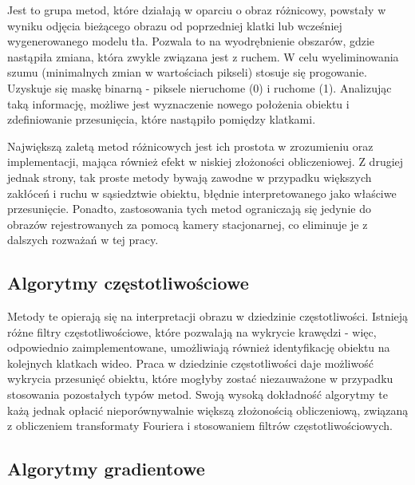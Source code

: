 Jest to grupa metod, które działają w oparciu o obraz różnicowy, powstały w wyniku odjęcia bieżącego obrazu od poprzedniej klatki lub wcześniej wygenerowanego modelu tła. %
Pozwala to na wyodrębnienie obszarów, gdzie nastąpiła zmiana, która zwykle związana jest z ruchem. %
W celu wyeliminowania szumu (minimalnych zmian w wartościach pikseli) stosuje się progowanie. 
Uzyskuje się maskę binarną - piksele nieruchome (0) i ruchome (1). 
Analizując taką informację, możliwe jest wyznaczenie nowego położenia obiektu i zdefiniowanie przesunięcia, które nastąpiło pomiędzy klatkami. 

Największą zaletą metod różnicowych jest ich prostota w zrozumieniu oraz implementacji, mająca również efekt w niskiej złożoności obliczeniowej. 
Z drugiej jednak strony, tak proste metody bywają zawodne w przypadku większych zakłóceń i ruchu w sąsiedztwie obiektu, błędnie interpretowanego jako właściwe przesunięcie. 
Ponadto, zastosowania tych metod ograniczają się jedynie do obrazów rejestrowanych za pomocą kamery stacjonarnej, co eliminuje je z dalszych rozważań w tej pracy. 


\subsection{Algorytmy częstotliwościowe}

Metody te opierają się na interpretacji obrazu w dziedzinie częstotliwości. 
Istnieją różne filtry częstotliwościowe, które pozwalają na wykrycie krawędzi - więc, odpowiednio zaimplementowane, umożliwiają również identyfikację obiektu na kolejnych klatkach wideo. %
Praca w dziedzinie częstotliwości daje możliwość wykrycia przesunięć obiektu, które mogłyby zostać niezauważone w przypadku stosowania pozostałych typów metod. 
Swoją wysoką dokładność algorytmy te każą jednak opłacić nieporównywalnie większą złożonością obliczeniową, związaną z obliczeniem transformaty Fouriera i stosowaniem filtrów częstotliwościowych. %

\subsection{Algorytmy gradientowe}

